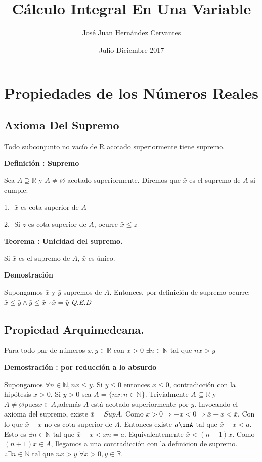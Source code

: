 \documentclass{book}
\title{Cálculo Integral En Una Variable}
\author{José Juan Hernández Cervantes}
\date{Julio-Diciembre 2017}
\begin{document}
\maketitle
\chapter{Propiedades de los Números Reales}
\section{Axioma Del Supremo}
Todo subconjunto no vacío de R acotado superiormente tiene supremo.

\textbf{Definición : Supremo}

Sea $A \supseteq \mathbb{R}$ y $A \neq \varnothing$ acotado superiormente.
Diremos que $\bar{x}$  es el supremo de $A$ si cumple:

1.- $\bar{x}$  es cota superior de $A$


2.- Si $z$ es cota superior de $A$, ocurre $\bar{x}\le z$

\textbf{Teorema : Unicidad del supremo.}

Si $\bar{x}$ es el supremo de $A$, $\bar{x}$ es único.

\textbf{Demostración}

Supongamos $\bar{x}$ y $\bar{y}$ supremos de
$A$. Entonces, por definición de supremo ocurre:
$\bar{x}\le\bar{y}\land\bar{y}\le\bar{x}$
$\therefore \bar{x}=\bar{y}$
\textit{Q.E.D}

\section{Propiedad Arquimedeana.}

Para todo par de números $x,y\in \mathbb{R}$ con $x> 0$ $\exists n\in\mathbb{N}$ tal que $nx> y$

\textbf{Demostración : por reducción a lo absurdo}


Supongamos $\forall{n}\in\mathbb{N},nx\le{y}$.
Si $y\le{0}$ entonces $x\le{0}$, contradicción con la hipótesis $x>0$.
Si $y>0$ sea $A=\lbrace nx:n\in{\mathbb{N}}\rbrace $.
Trivialmente $A\subseteq{\mathbb{R}}$ y $A\neq \varnothing
\mbox{pues}x\in A$,además $A$ está acotado superiormente por $y$.
Invocando el axioma del supremo, existe $\bar{x}=SupA$.
Como $x>0 \Rightarrow -x<0\Rightarrow \bar{x}-x<\bar{x}$.
Con lo que $\bar{x}-x$ no es cota superior de \textit{A}.
Entonces existe $a\inA$ tal que $\bar{x}-x<a$.
Esto es $\exists{n}\in{\mathbb{N}}\mbox{ tal que }\bar{x}-x<xn=a$. Equivalentemente $\bar{x}<(n+1)x$.
Como $(n+1)x\in{A}$, llegamos a una contradicción con la definicion de supremo.
$\therefore\exists{n}\in{\mathbb{N}}\mbox{ tal que }nx>y$ $\forall x>0,y\in{\mathbb{R}}$.
\end{document}
